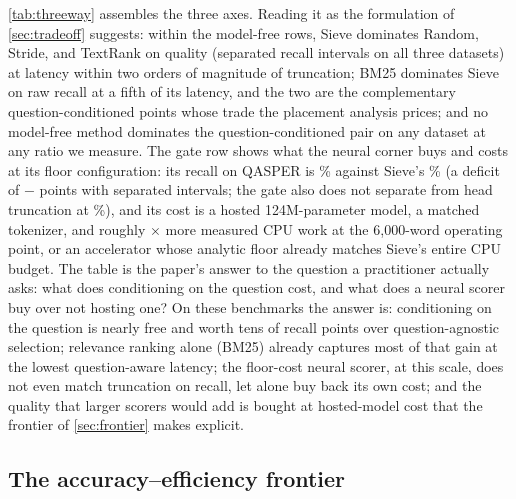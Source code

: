 \documentclass[pdflatex,sn-basic]{sn-jnl}
\theoremstyle{remark}
\newcommand{\method}{Sieve}
\begin{document}
\autoref{tab:threeway} assembles the three axes. Reading it as the
formulation of \autoref{sec:tradeoff} suggests: within the model-free
rows, \method{} dominates Random, Stride, and TextRank on quality
(separated recall intervals on all three datasets) at latency within
two orders of magnitude of truncation; BM25 dominates \method{} on
raw recall at a fifth of its latency, and the two are the
complementary question-conditioned points whose trade the placement
analysis prices; and no model-free method dominates the
question-conditioned pair on any dataset at any ratio we measure. The
gate row shows what the neural corner buys and costs at its floor
configuration: its recall on QASPER is \GateRecall\% against
\method{}'s \RecQSie\% (a deficit of
\RecQSie{}$-$\GateRecall{} points with separated intervals; the gate
also does not separate from head truncation at \RecQHea\%), and its
cost is a hosted 124M-parameter model, a matched tokenizer, and
roughly \GateSieRatioSixk$\times$ more measured CPU work at the
6{,}000-word operating point, or an accelerator whose analytic floor
already matches \method{}'s entire CPU budget. The table is the
paper's answer to the question a practitioner actually asks: what
does conditioning on the question cost, and what does a neural scorer
buy over not hosting one? On these benchmarks the answer is:
conditioning on the question is nearly free and worth tens of recall
points over question-agnostic selection; relevance ranking alone
(BM25) already captures most of that gain at the lowest
question-aware latency; the floor-cost neural scorer, at this scale,
does not even match truncation on recall, let alone buy back its own
cost; and the quality that larger scorers would add is bought at
hosted-model cost that the frontier of \autoref{sec:frontier} makes
explicit.

\subsection{The accuracy--efficiency frontier}
\label{sec:frontier}
\end{document}
